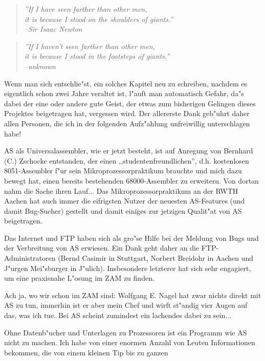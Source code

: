 \documentclass[12pt,a4paper,twoside]{report}
\begin{document}
\begin{quote}{\it
''If I have seen farther than other men, \\
it is because I stood on the shoulders of giants.'' \\
\hspace{2cm} --Sir Isaac Newton}
\end{quote}
\begin{quote}{\it
''If I haven't seen farther than other men, \\
it is because I stood in the footsteps of giants.'' \\
\hspace{2cm} --unknown}
\end{quote}
\par
Wenn man sich entschlie"st, ein solches Kapitel neu zu schreiben,
nachdem es eigentlich schon zwei Jahre veraltet ist, l"auft man
automatisch Gefahr, da"s dabei der eine oder andere gute Geist, der
etwas zum bisherigen Gelingen dieses Projektes beigetragen hat,
vergessen wird.  Der
allererste  Dank geb"uhrt daher allen Personen, die ich in der
folgenden Aufz"ahlung unfreiwillig unterschlagen habe!
\par
AS als Universalassembler, wie er jetzt besteht, ist auf Anregung von
Bernhard (C.) Zschocke entstanden, der einen ,,studentenfreundlichen'',
d.h. kostenlosen 8051-Assembler f"ur sein Mikroprozessorpraktikum
brauchte und mich dazu bewegt hat, einen bereits bestehenden
68000-Assembler zu erweitern.  Von dortan nahm die Sache ihren Lauf...
Das Mikroprozessorpraktikum an der RWTH Aachen hat auch immer die
eifrigsten Nutzer der neuesten AS-Features (und damit Bug-Sucher)
gestellt und damit einiges zur jetzigen Qualit"at von AS beigetragen.
\par
Das Internet und FTP haben sich als gro"se Hilfe bei der Meldung von
Bugs und der Verbreitung von AS erwiesen.  Ein Dank geht daher an
die FTP-Administratoren (Bernd Casimir in Stuttgart, Norbert Breidohr
in Aachen und J"urgen Mei"sburger in J"ulich).  Insbesondere letzterer
hat sich sehr engagiert, um eine praxisnahe L"osung im ZAM zu
finden.
\par
Ach ja, wo wir schon im ZAM sind: Wolfgang E. Nagel hat zwar nichts
direkt mit AS zu tun, immerhin ist er aber mein Chef und wirft
st"andig vier Augen auf das, was ich tue.  Bei AS scheint zumindest
ein lachendes dabei zu sein...
\par
Ohne Datenb"ucher und Unterlagen zu Prozessoren ist ein Programm wie
AS nicht zu machen.  Ich habe von einer enormen Anzahl von Leuten
Informationen bekommen, die von einem kleinen Tip bis zu ganzen
\end{document}
